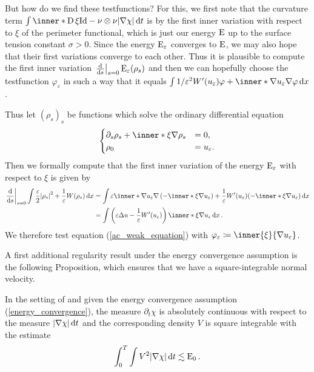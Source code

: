 But how do we find these testfunctions? For this, we first note that the 
curvature term
$ \int \inner*{ \diff \xi }{ \mathrm{Id} - \nu \otimes \nu } \abs{ \nabla \chi 
} \dd{ t } $ is by \cite[Thm.~17.5]{maggi_sets_of_finite_perimeter} the first 
inner variation with respect to $ \xi $ of the perimeter functional, which is 
just our energy $ \operatorname{E} $ up to the surface tension constant $ \sigma > 0 $. 
Since the energy $ \operatorname{E}_{ \varepsilon } $ converges to $ \operatorname{E} $, we may 
also hope that their first variations converge to each other. Thus it is 
plausible to compute the first inner variation 
$ \left.\dv{ s } \right|_{ s = 0 } \operatorname{E}_{ \varepsilon } ( \rho_{ s } ) $ and 
then we can hopefully choose the testfunction $ \varphi_{ \varepsilon } $ in 
such a way that it equals
$ 
\int
1 / \varepsilon^{ 2 }  W' ( u_{ \varepsilon} ) \varphi
+
\inner*{ \nabla u_{ \varepsilon } }{ \nabla \varphi }
\dd{x}
$.

Thus let $ ( \rho_{ s } )_{ s } $ be functions which solve the ordinary 
differential equation
\[
\begin{cases}
	\partial_{ s } \rho_{ s } 
	+
	\inner*{ \xi }{ \nabla \rho_{ s } }
	& = 0,
	\\
	\rho_{ 0 } & = u_{ \varepsilon }.
\end{cases}
\]
Then we formally compute that the first inner variation of the energy $ 
\operatorname{E}_{ \varepsilon } $ with respect to $ \xi $ is given by
\begin{align*}
	\left.\dv{ s }\right|_{ s = 0 }
	\int
	\frac{ \varepsilon }{ 2 }
	\abs{ \rho_{ s } }^{ 2 }
	+
	\frac{ 1 }{ \varepsilon }
	W ( \rho_{ s } )
	\dd{ x }
	& =
	\int
	\varepsilon 
	\inner*{ \nabla u_{ \varepsilon } }
	{ \nabla \left( - \inner*{ \xi }{ \nabla u_{ \varepsilon } } \right) }
	+
	\frac{ 1 }{ \varepsilon }
	W'( u_{ \varepsilon } ) ( -\inner*{ \xi }{ \nabla u_{ \varepsilon } } )
	\dd{ x }
	\\
	& =
	\int
	\left(
	\varepsilon \Delta u - \frac{ 1 }{ \varepsilon } W'( u_{ \varepsilon } )
	\right)
	\inner*{ \xi }{ \nabla u_{ \varepsilon } } 
	\dd{ x }.
\end{align*}
We therefore test equation (\ref{ac_weak_equation}) with $ \varphi_{ 
\varepsilon } \coloneqq \inner{ \xi }{ \nabla u_{ \varepsilon } } $.

A first additional regularity result under the energy convergence assumption is 
the following Proposition, which ensures that we have a square-integrable 
normal velocity.

\begin{proposition}
	\label{existence_of_velocity_twophase}
	In the setting of  and given the energy 
	convergence assumption (\ref{energy_convergence}), the measure $ \partial_{ 
		t } \chi $ is absolutely continuous with respect to the measure $ \abs{ 
		\nabla \chi } \dd{ t } $ and the corresponding density $ V $ is square 
	integrable with the estimate
	\begin{equation*}
		\int_{ 0 }^{ T }
		\int
		V^{ 2 }
		\abs{ \nabla \chi }
		\dd{ t }
		\lesssim
		\operatorname{E}_{ 0 }.
	\end{equation*}
\end{proposition}

